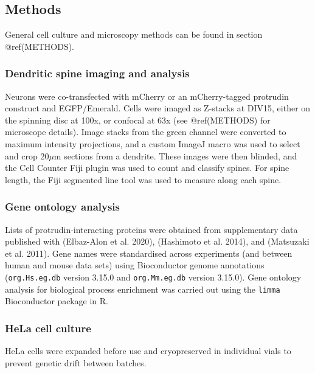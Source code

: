 \documentclass[
]{article}
\begin{document}
\hypertarget{methods}{%
\subsection{Methods}\label{methods}}

General cell culture and microscopy methods can be found in section
@ref(METHODS).

\hypertarget{dendritic-spine-imaging-and-analysis}{%
\subsubsection{Dendritic spine imaging and
analysis}\label{dendritic-spine-imaging-and-analysis}}

Neurons were co-transfected with mCherry or an mCherry-tagged protrudin
construct and EGFP/Emerald. Cells were imaged as Z-stacks at DIV15,
either on the spinning disc at 100x, or confocal at 63x (see
@ref(METHODS) for microscope details). Image stacks from the green
channel were converted to maximum intensity projections, and a custom
ImageJ macro was used to select and crop 20\(\mu\)m sections from a
dendrite. These images were then blinded, and the Cell Counter Fiji
plugin was used to count and classify spines. For spine length, the Fiji
segmented line tool was used to measure along each spine.

\hypertarget{gene-ontology-analysis}{%
\subsubsection{Gene ontology analysis}\label{gene-ontology-analysis}}

Lists of protrudin-interacting proteins were obtained from supplementary
data published with (Elbaz-Alon et al. 2020), (Hashimoto et al. 2014),
and (Matsuzaki et al. 2011). Gene names were standardised across
experiments (and between human and mouse data sets) using Bioconductor
genome annotations (\texttt{org.Hs.eg.db} version 3.15.0 and
\texttt{org.Mm.eg.db} version 3.15.0). Gene ontology analysis for
biological process enrichment was carried out using the \texttt{limma}
Bioconductor package in R.

\hypertarget{hela-cell-culture}{%
\subsubsection{HeLa cell culture}\label{hela-cell-culture}}

HeLa cells were expanded before use and cryopreserved in individual
vials to prevent genetic drift between batches.
\end{document}
